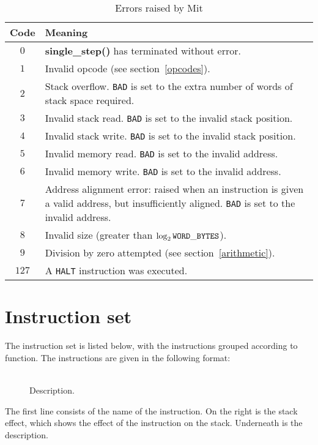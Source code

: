 \documentclass[a4paper]{article}
\newcommand{\spic}[1]{\texttt{\textsl{#1\/}}}
\newlength{\itemwidth}\itemwidth=\textwidth \advance\itemwidth by -0.1in
\newlength{\instname}\instname=1.5in
\newlength{\stackcom}\stackcom=3.0in
\newcommand{\inst}[3]{\item[]\parbox{\itemwidth}%
{\makebox[\instname][l]{\tt #1}%
\makebox[\stackcom][r]{\tt ( \spic{#2} )}\\[0.5ex]#3}}
\begin{document}
\begin{table}[htbp]
\begin{center}
\begin{tabular}{cp{4in}} \toprule
\bf Code & \bf Meaning \\ \midrule
$0$ & {\bf single\_step()} has terminated without error. \\
$1$ & Invalid opcode (see section~\ref{opcodes}). \\
$2$ & Stack overflow. {\tt BAD} is set to the extra number of words of stack space required. \\
$3$ & Invalid stack read. {\tt BAD} is set to the invalid stack position. \\
$4$ & Invalid stack write. {\tt BAD} is set to the invalid stack position. \\
$5$ & Invalid memory read. {\tt BAD} is set to the invalid address. \\
$6$ & Invalid memory write. {\tt BAD} is set to the invalid address. \\
$7$ & Address alignment error: raised when an instruction is given a valid address, but insufficiently aligned. {\tt BAD} is set to the invalid address. \\
$8$ & Invalid size (greater than $\log_2{\tt WORD\_BYTES}$). \\
$9$ & Division by zero attempted (see section~\ref{arithmetic}). \\
$127$ & A {\tt HALT} instruction was executed. \\
 \bottomrule
\end{tabular}
\caption{\label{errortable}Errors raised by Mit}
\end{center}
\end{table}


\section{Instruction set}
\label{instset}

The instruction set is listed below,
with the instructions grouped according to function. The
instructions are given in the following format:

\begin{description}
\inst{NAME}{before — after}{Description.}
\end{description}

The first line consists of the name of the instruction. On the right is the
stack effect, which shows the effect of the instruction on the stack.
Underneath is the description.
\end{document}
